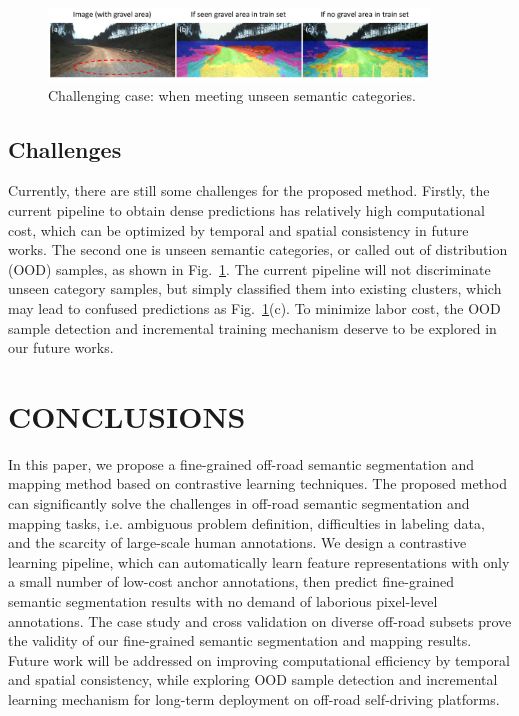 \documentclass[letterpaper, 10 pt, conference]{ieeeconf}  %
\begin{document}
\begin{figure}[]
	\centering
	\includegraphics[width=0.9\textwidth]{challenges.pdf}
	\caption{Challenging case: when meeting unseen semantic categories.}
	\label{fig:challenges}
	\vspace{-4mm}
\end{figure}

\subsection{Challenges}
Currently, there are still some challenges for the proposed method. Firstly, the current pipeline to obtain dense predictions has relatively high computational cost, which can be optimized by temporal and spatial consistency in future works.
The second one is unseen semantic categories, or called out of distribution (OOD) samples, as shown in Fig.~\ref{fig:challenges}. The current pipeline will not discriminate unseen category samples, but simply classified them into existing clusters, which may lead to confused predictions as Fig.~\ref{fig:challenges}(c). To minimize labor cost, the OOD sample detection and incremental training mechanism deserve to be explored in our future works.



\section{CONCLUSIONS}	\label{conclusions}
In this paper, we propose a fine-grained off-road semantic segmentation and mapping method based on contrastive learning techniques. The proposed method can significantly solve the challenges in off-road semantic segmentation and mapping tasks, i.e. ambiguous problem definition, difficulties in labeling data, and the scarcity of large-scale human annotations. We design a contrastive learning pipeline, which can automatically learn feature representations with only a small number of low-cost anchor annotations, then predict fine-grained semantic segmentation results with no demand of laborious pixel-level annotations. The case study and cross validation on diverse off-road subsets prove the validity of our fine-grained semantic segmentation and mapping results. Future work will be addressed on improving computational efficiency by temporal and spatial consistency, while exploring OOD sample detection and incremental learning mechanism for long-term deployment on off-road self-driving platforms.
\end{document}
